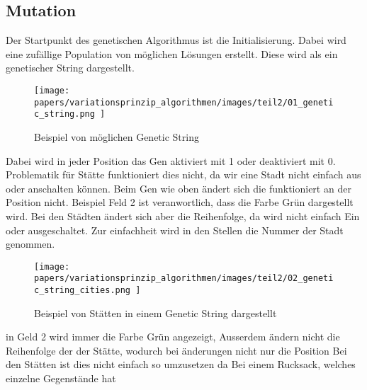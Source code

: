 %
%
%
%
\subsection{Mutation
\label{genetic_algorithm:mutation}}
Der Startpunkt des genetischen Algorithmus ist die Initialisierung.
Dabei wird eine zufällige Population von möglichen Lösungen erstellt.
Diese wird als ein genetischer String dargestellt.

\begin{figure} [h]
	\centering
	\texttt{[image: 
        papers/variationsprinzip\_algorithmen/images/teil2/01\_genetic\_string.png
        ]}
	\caption{Beispiel von möglichen Genetic String}
	\label{fig:possible_genetic_string}
\end{figure}

Dabei wird in jeder Position das Gen aktiviert mit 1 oder deaktiviert mit 0.
Problematik für Stätte funktioniert dies nicht, da wir eine Stadt nicht
einfach aus oder anschalten können. Beim Gen wie oben ändert sich die funktioniert
an der Position nicht. Beispiel Feld 2 ist veranwortlich, dass die Farbe Grün
dargestellt wird. Bei den Städten ändert sich aber die Reihenfolge, da wird 
nicht einfach Ein oder ausgeschaltet. Zur einfachheit wird in den Stellen 
die Nummer der Stadt genommen.

\begin{figure} [h]
	\centering
	\texttt{[image: 
        papers/variationsprinzip\_algorithmen/images/teil2/02\_genetic\_string\_cities.png
        ]}
	\caption{Beispiel von Stätten in einem Genetic String dargestellt}
	\label{fig:cities_genetic_string}
\end{figure}


in Geld 2 wird immer die Farbe Grün angezeigt,  Ausserdem ändern nicht die Reihenfolge
der der Stätte, wodurch bei änderungen nicht nur die Position 
Bei den Stätten ist dies nicht einfach so umzusetzen da Bei einem Rucksack, welches einzelne Gegenstände hat 


